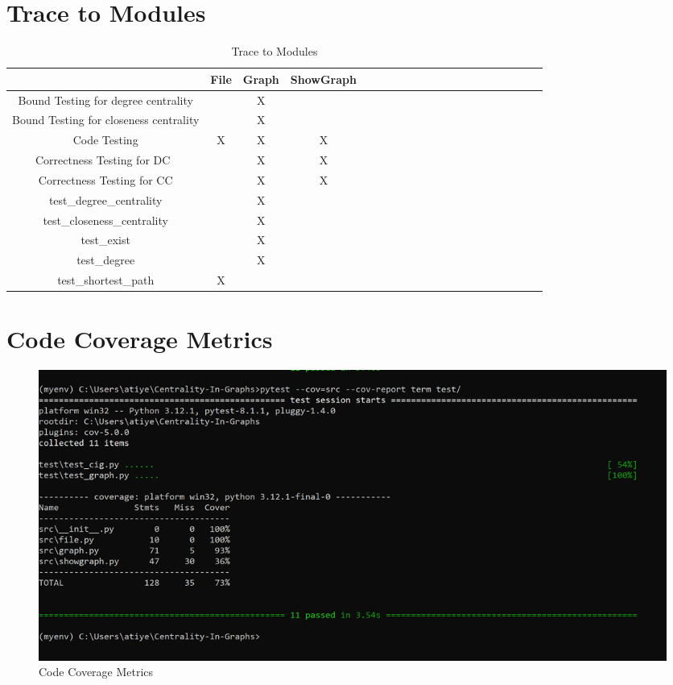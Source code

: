 \documentclass[12pt, titlepage]{article}
\begin{document}
\section{Trace to Modules}		
\begin{table}[h!]
\centering
\begin{tabular}{|c|c|c|c|c|c|c|c|c|c|c|c|c|c|c|c|c|c|c|c|}
\hline
	&File &Graph & ShowGraph \\
\hline
 Bound Testing for degree centrality     & & X& \\ \hline
Bound Testing for closeness centrality    & &  X&  \\ \hline
Code Testing    &  X & X  & X \\ \hline
Correctness Testing for DC\    & &X   & X\\ \hline
Correctness Testing for CC    &  &  X& X \\ \hline
test\_degree\_centrality    &  & X &   \\ \hline
 test\_closeness\_centrality    &  &  X& \\ \hline
test\_exist    &  &X  &  \\ \hline
test\_degree    & &X  &  \\ \hline
test\_shortest\_path    &X  &  & \\ \hline
\end{tabular}
\label{Table:A_trace}
\caption{Trace to Modules}
\end{table}	
\newpage
\section{Code Coverage Metrics}
\begin{figure}[h!]
    \centering
   \includegraphics[width=1.0\textwidth, keepaspectratio]{cov.png}
    \caption{Code Coverage Metrics}
\end{figure}




\newpage{}
\end{document}
